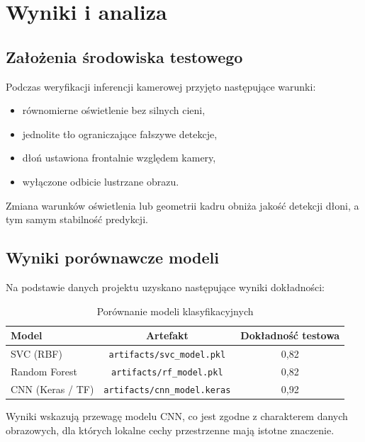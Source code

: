 \chapter{Wyniki i analiza}
\label{cha:elementyPracy}

\section{Założenia środowiska testowego}
\label{sec:warunki_testowe}

Podczas weryfikacji inferencji kamerowej przyjęto następujące warunki:
\begin{itemize}
    \item równomierne oświetlenie bez silnych cieni,
    \item jednolite tło ograniczające fałszywe detekcje,
    \item dłoń ustawiona frontalnie względem kamery,
    \item wyłączone odbicie lustrzane obrazu.
\end{itemize}

Zmiana warunków oświetlenia lub geometrii kadru obniża jakość detekcji dłoni,
a tym samym stabilność predykcji.

\section{Wyniki porównawcze modeli}
\label{sec:wyniki_porownawcze}

Na podstawie danych projektu uzyskano następujące wyniki dokładności:
\begin{table}[H]
    \centering
    \caption{Porównanie modeli klasyfikacyjnych}
    \label{tab:model_benchmark}
    \begin{tabular}{lcc}
        \toprule
        \textbf{Model}        & \textbf{Artefakt}                  & \textbf{Dokładność testowa} \\
        \midrule
        SVC (RBF)             & \texttt{artifacts/svc\_model.pkl}  & 0,82                        \\
        Random Forest         & \texttt{artifacts/rf\_model.pkl}   & 0,82                        \\
        CNN (Keras / TF)      & \texttt{artifacts/cnn\_model.keras}& 0,92                        \\
        \bottomrule
    \end{tabular}
\end{table}

Wyniki wskazują przewagę modelu CNN, co jest zgodne z charakterem danych
obrazowych, dla których lokalne cechy przestrzenne mają istotne znaczenie.

